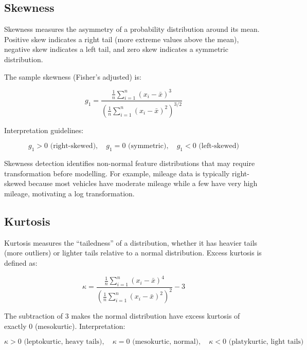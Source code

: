 \documentclass[10pt,a4paper]{article}
\begin{document}
\subsection{Skewness}
\label{sec:skewness}

Skewness measures the asymmetry of a probability distribution around its mean. Positive skew indicates a right tail (more extreme values above the mean), negative skew indicates a left tail, and zero skew indicates a symmetric distribution.

The sample skewness (Fisher's adjusted) is:

\begin{equation}
g_1 = \frac{\frac{1}{n}\sum_{i=1}^{n}(x_i - \bar{x})^3}{\left(\frac{1}{n}\sum_{i=1}^{n}(x_i - \bar{x})^2\right)^{3/2}}
\label{eq:skewness}
\end{equation}

Interpretation guidelines:

\begin{equation}
g_1 > 0 \text{ (right-skewed)}, \quad g_1 = 0 \text{ (symmetric)}, \quad g_1 < 0 \text{ (left-skewed)}
\label{eq:skewness-interpretation}
\end{equation}

Skewness detection identifies non-normal feature distributions that may require transformation before modelling. For example, mileage data is typically right-skewed because most vehicles have moderate mileage while a few have very high mileage, motivating a log transformation.

\subsection{Kurtosis}
\label{sec:kurtosis}

Kurtosis measures the ``tailedness'' of a distribution, whether it has heavier tails (more outliers) or lighter tails relative to a normal distribution. Excess kurtosis is defined as:

\begin{equation}
\kappa = \frac{\frac{1}{n}\sum_{i=1}^{n}(x_i - \bar{x})^4}{\left(\frac{1}{n}\sum_{i=1}^{n}(x_i - \bar{x})^2\right)^2} - 3
\label{eq:kurtosis}
\end{equation}

The subtraction of 3 makes the normal distribution have excess kurtosis of exactly 0 (mesokurtic). Interpretation:

\begin{equation}
\kappa > 0 \text{ (leptokurtic, heavy tails)}, \quad \kappa = 0 \text{ (mesokurtic, normal)}, \quad \kappa < 0 \text{ (platykurtic, light tails)}
\label{eq:kurtosis-interpretation}
\end{equation}
\end{document}
